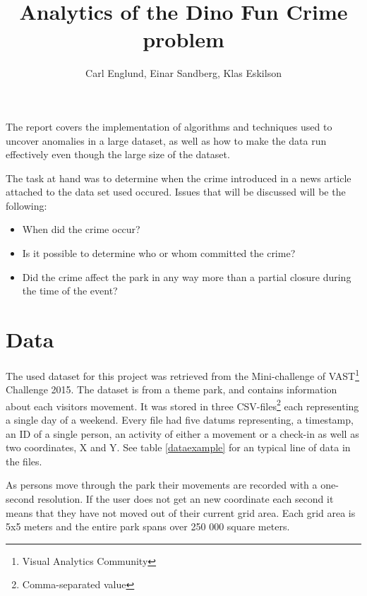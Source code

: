 \documentclass[journal]{vgtc}                %
\title{Analytics of the Dino Fun Crime problem}
\author{Carl Englund, Einar Sandberg, Klas Eskilson}
\begin{document}


\maketitle The report covers the implementation of algorithms and techniques used to uncover anomalies in a large dataset, as well as how to make the data run effectively even though the large size of the dataset. 

The task at hand was to determine when the crime introduced in a news article attached to the data set used occured. Issues that will be discussed will be the following:
\begin{itemize}
	\item When did the crime occur?
	\item Is it possible to determine who or whom committed the crime?
	\item Did the crime affect the park in any way more than a partial closure during the time of the event?	
\end{itemize}

\section{Data}
The used dataset for this project was retrieved from the Mini-challenge of VAST\footnote{Visual Analytics Community
} Challenge 2015. The dataset is from a theme park, and contains information about each visitors movement. It was stored in three CSV-files\footnote{Comma-separated value
} each representing a single day of a weekend. Every file had five datums representing, a timestamp,  an ID of a single person, an activity of either a movement or a check-in as well as two coordinates, X and Y. See table \ref{dataexample} for an typical line of data in the files.

As persons move through the park their movements are recorded with a one-second resolution. If the user does not get an new coordinate each second it means that they have not moved out of their current grid area. Each grid area is 5x5 meters and the entire park spans over 250 000 square meters.
\end{document}
